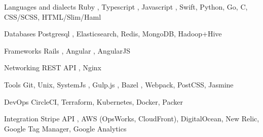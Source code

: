 
\begin{cvskills}

  \cvskill
    {Languages and dialects} %
    {Ruby \cvstar, Typescript \cvstar, Javascript \cvstar, Swift, Python, Go, C, CSS/SCSS, HTML/Slim/Haml} %

  \cvskill
    {Databases} %
    {Postgresql \cvstar, Elasticsearch, Redis, MongoDB, Hadoop+Hive} %

  \cvskill
    {Frameworks} %
    {Rails \cvstar, Angular \cvstar, AngularJS} %

  \cvskill
    {Networking} %
    {REST API \cvstar, Nginx} %

  \cvskill
    {Tools} %
    {Git, Unix, SystemJs \cvstar, Gulp.js \cvstar, Bazel \cvstar, Webpack, PostCSS, Jasmine} %

  \cvskill
    {DevOps} %
    {CircleCI, Terraform, Kubernetes, Docker, Packer} %


  \cvskill
    {Integration} %
    {Stripe API \cvstar, AWS (OpsWorks, CloudFront), DigitalOcean, New Relic, Google Tag Manager, Google Analytics} %


\end{cvskills}
